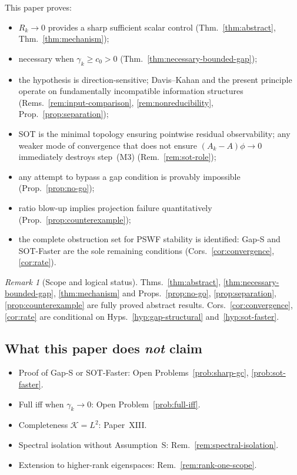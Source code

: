 \documentclass[12pt,a4paper]{amsart}
\theoremstyle{definition}
\theoremstyle{remark}
\newtheorem{remark}[theorem]{Remark}
\begin{document}
\medskip
This paper proves:
\begin{itemize}
\item $R_k\to 0$ provides a sharp
  sufficient scalar control
  (Thm.~\ref{thm:abstract},
  Thm.~\ref{thm:mechanism});
\item necessary when $\gamma_k\ge c_0>0$
  (Thm.~\ref{thm:necessary-bounded-gap});
\item the hypothesis is direction-sensitive;
  Davis--Kahan and the present principle
  operate on fundamentally incompatible
  information structures
  (Rems.~\ref{rem:input-comparison},
  \ref{rem:nonreducibility},
  Prop.~\ref{prop:separation});
\item SOT is the minimal topology
  ensuring pointwise residual
  observability; any weaker mode
  of convergence that does not ensure
  $(A_k-A)\phi\to 0$ immediately
  destroys step~(M3)
  (Rem.~\ref{rem:sot-role});
\item any attempt to bypass a gap
  condition is provably impossible
  (Prop.~\ref{prop:no-go});
\item ratio blow-up implies projection
  failure quantitatively
  (Prop.~\ref{prop:counterexample});
\item the complete obstruction set
  for PSWF stability is identified:
  Gap-S and SOT-Faster are the sole
  remaining conditions
  (Cors.~\ref{cor:convergence},
  \ref{cor:rate}).
\end{itemize}

\begin{remark}[Scope and logical status]
\label{rem:scope}
Thms.~\ref{thm:abstract},
\ref{thm:necessary-bounded-gap},
\ref{thm:mechanism}
and Props.~\ref{prop:no-go},
\ref{prop:separation},
\ref{prop:counterexample}
are fully proved abstract results.
Cors.~\ref{cor:convergence},
\ref{cor:rate} are conditional on
Hyps.~\ref{hyp:gap-structural}
and~\ref{hyp:sot-faster}.
\end{remark}

\subsection{What this paper does
  \emph{not} claim}
\begin{itemize}
\item Proof of Gap-S or SOT-Faster:
  Open Problems~\ref{prob:sharp-gc},
  \ref{prob:sot-faster}.
\item Full iff when $\gamma_k\to 0$:
  Open Problem~\ref{prob:full-iff}.
\item Completeness $\mathcal{K}=L^2$:
  Paper~XIII.
\item Spectral isolation without
  Assumption~S:
  Rem.~\ref{rem:spectral-isolation}.
\item Extension to higher-rank
  eigenspaces:
  Rem.~\ref{rem:rank-one-scope}.
\end{itemize}
\end{document}
